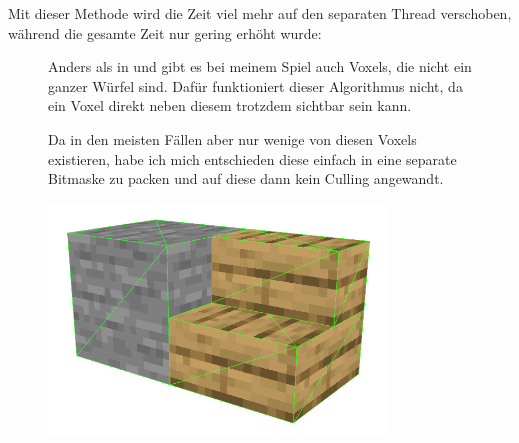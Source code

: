 Mit dieser Methode wird die Zeit viel mehr auf den
separaten Thread verschoben, während die gesamte
Zeit nur gering erhöht wurde:

\vspace{0.3cm}



\begin{figure}[ht]
	\begin{minipage}[c]{0.63\textwidth}
Anders als in \cite{yt_bin_greedy_mesher} und
\cite{gh_bin_greedy_mesher} gibt es bei meinem
Spiel auch Voxels, die nicht ein ganzer Würfel
sind. Dafür funktioniert dieser Algorithmus nicht,
da ein Voxel direkt neben diesem trotzdem sichtbar
sein kann.

Da in den meisten Fällen aber nur wenige von diesen
 Voxels existieren, habe ich mich
entschieden diese einfach in eine separate Bitmaske
zu packen und auf diese dann kein Culling angewandt.
	\end{minipage}
	\begin{minipage}[c]{0.35\textwidth}
		\begin{center}
\includegraphics[width=0.8\textwidth]{../assets/culling/stair_next_to_stone.png}
		\end{center}
	\end{minipage}\hfill
\end{figure}

